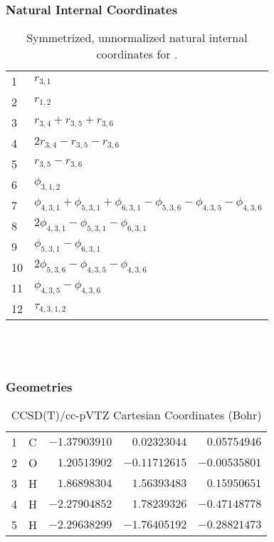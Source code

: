 \documentclass[10pt,oneside]{article}
\begin{document}
\subsubsection*{Natural Internal Coordinates}
\begin{table}[h!]
\centering
\caption{Symmetrized, unnormalized natural internal coordinates for .}
\small
\begin{tabular}{ll}
  1   & $r_{3,1}$ \\
  2   & $r_{1,2}$ \\
  3   & $r_{3,4} + r_{3,5} + r_{3,6}$ \\
  4   & $2r_{3,4} - r_{3,5} - r_{3,6}$ \\
  5   & $r_{3,5} - r_{3,6}$ \\
  6   & $\phi_{3,1,2}$ \\
  7   & $\phi_{4,3,1} + \phi_{5,3,1} + \phi_{6,3,1} - \phi_{5,3,6} - \phi_{4,3,5} - \phi_{4,3,6}$ \\
  8   & $2\phi_{4,3,1} - \phi_{5,3,1} - \phi_{6,3,1}$ \\
  9   & $\phi_{5,3,1} - \phi_{6,3,1}$ \\
  10  & $2\phi_{5,3,6} - \phi_{4,3,5} - \phi_{4,3,6}$ \\
  11  & $\phi_{4,3,5} - \phi_{4,3,6}$ \\
  12  & $\tau_{4,3,1,2}$ \\
\end{tabular}
\end{table}

\clearpage

\subsection{\ \ \ }

\subsubsection*{Geometries}
\begin{table}[h!]
\centering
\caption{CCSD(T)/cc-pVTZ Cartesian Coordinates (Bohr)}
\begin{tabular}{llrrr}
1  & C  & $-1.37903910$ & $ 0.02323044$ & $ 0.05754946$ \\
2  & O  & $ 1.20513902$ & $-0.11712615$ & $-0.00535801$ \\
3  & H  & $ 1.86898304$ & $ 1.56393483$ & $ 0.15950651$ \\
4  & H  & $-2.27904852$ & $ 1.78239326$ & $-0.47148778$ \\
5  & H  & $-2.29638299$ & $-1.76405192$ & $-0.28821473$ \\
\end{tabular}
\end{table}
\end{document}
